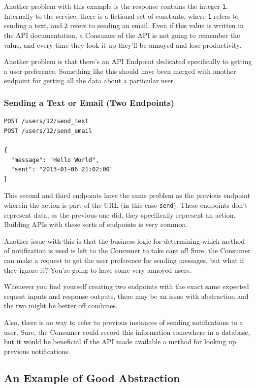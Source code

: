 \documentclass{book}
\begin{document}
Another problem with this example is the response contains the integer \texttt{1}. Internally to the service, there is a fictional set of constants, where \texttt{1} refers to sending a text, and \texttt{2} refers to sending an email. Even if this value is written in the API documentation, a Consumer of the API is not going to remember the value, and every time they look it up they'll be annoyed and lose productivity.

Another problem is that there's an API Endpoint dedicated specifically to getting a user preference. Something like this should have been merged with another endpoint for getting all the data about a particular user.

\subsubsection{Sending a Text or Email (Two Endpoints)}

\begin{verbatim}
POST /users/12/send_text
POST /users/12/send_email

{
  "message": "Hello World",
  "sent": "2013-01-06 21:02:00"
}
\end{verbatim}

This second and third endpoints have the same problem as the previous endpoint wherein the action is part of the URL (in this case \texttt{send}). These endpoints don't represent data, as the previous one did, they specifically represent an action. Building APIs with these sorts of endpoints is very common.

Another issue with this is that the business logic for determining which method of notification is used is left to the Consumer to take care of! Sure, the Consumer can make a request to get the user preference for sending messages, but what if they ignore it? You're going to have some very annoyed users.

Whenever you find yourself creating two endpoints with the exact same expected request inputs and response outputs, there may be an issue with abstraction and the two might be better off combines.

Also, there is no way to refer to previous instances of sending notifications to a user. Sure, the Consumer could record this information somewhere in a database, but it would be beneficial if the API made available a method for looking up previous notifications.

\subsection{An Example of Good Abstraction}
\end{document}
